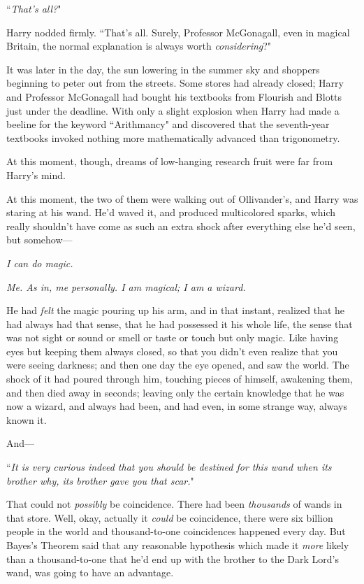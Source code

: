 ``\emph{That's all?}"

Harry nodded firmly. ``That's all. Surely, Professor McGonagall, even in magical Britain, the normal explanation is always worth \emph{considering}?"

\later

It was later in the day, the sun lowering in the summer sky and shoppers beginning to peter out from the streets. Some stores had already closed; Harry and Professor McGonagall had bought his textbooks from Flourish and Blotts just under the deadline. With only a slight explosion when Harry had made a beeline for the keyword ``Arithmancy" and discovered that the seventh-year textbooks invoked nothing more mathematically advanced than trigonometry.

At this moment, though, dreams of low-hanging research fruit were far from Harry's mind.

At this moment, the two of them were walking out of Ollivander's, and Harry was staring at his wand. He'd waved it, and produced multicolored sparks, which really shouldn't have come as such an extra shock after everything else he'd seen, but somehow—

\emph{I can do magic.}

\emph{Me. As in, me personally. I am magical; I am a wizard.}

He had \emph{felt} the magic pouring up his arm, and in that instant, realized that he had always had that sense, that he had possessed it his whole life, the sense that was not sight or sound or smell or taste or touch but only magic. Like having eyes but keeping them always closed, so that you didn't even realize that you were seeing darkness; and then one day the eye opened, and saw the world. The shock of it had poured through him, touching pieces of himself, awakening them, and then died away in seconds; leaving only the certain knowledge that he was now a wizard, and always had been, and had even, in some strange way, always known it.

And—

``\emph{It is very curious indeed that you should be destined for this wand when its brother why, its brother gave you that scar.}"

That could not \emph{possibly} be coincidence. There had been \emph{thousands} of wands in that store. Well, okay, actually it \emph{could} be coincidence, there were six billion people in the world and thousand-to-one coincidences happened every day. But Bayes's Theorem said that any reasonable hypothesis which made it \emph{more} likely than a thousand-to-one that he'd end up with the brother to the Dark Lord's wand, was going to have an advantage.

